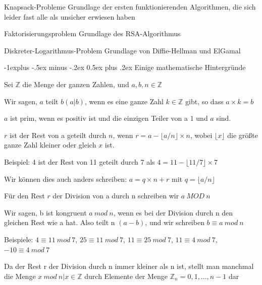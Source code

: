 \documentclass[a4paper]{article}
\makeatletter
\renewcommand{\subsection}{\@startsection{subsection}{2}{0mm}%
 {-1explus -.5ex minus -.2ex}%
 {0.5ex plus .2ex}%
 {\normalfont\normalsize\bfseries}}
\makeatother
\begin{document}
\begin{multicols}{3}
\begin{itemize*}
\begin{itemize*}
            \end{itemize*}
            \begin{description*}
                  \item[Knapsack-Probleme] Grundlage der ersten funktionierenden Algorithmen, die sich leider fast alle als unsicher erwiesen haben
                  \item[Faktorisierungsproblem] Grundlage des RSA-Algorithmus
                  \item[Diskreter-Logarithmus-Problem] Grundlage von Diffie-Hellman und ElGamal
            \end{description*}
      \end{itemize*}

      \subsection{Einige mathematische Hintergründe}
      \begin{itemize*}
            \item Sei $\mathbb{Z}$ die Menge der ganzen Zahlen, und $a,b,n\in\mathbb{Z}$
            \item Wir sagen, $a$ teilt $b(a| b)$, wenn es eine ganze Zahl $k\in\mathbb{Z}$ gibt, so dass $a\times k=b$
            \item $a$ ist prim, wenn es positiv ist und die einzigen Teiler von a $1$ und $a$ sind.
            \item $r$ ist der Rest von a geteilt durch $n$, wenn $r=a-\lfloor a / n \rfloor\times n$, wobei
            $\lfloor x\rfloor$ die größte ganze Zahl kleiner oder gleich $x$ ist.
            \begin{itemize*}
                  \item Beispiel: 4 ist der Rest von 11 geteilt durch 7 als $4=11-\lfloor 11/7\rfloor\times 7$
                  \item Wir können dies auch anders schreiben: $a=q\times n + r$ mit $q=\lfloor a/n\rfloor$
            \end{itemize*}
            \item Für den Rest $r$ der Division von a durch n schreiben wir $a\ MOD\ n$
            \item Wir sagen, b ist kongruent $a\ mod\ n$, wenn es bei der Division durch n den gleichen Rest wie a hat. Also teilt n $(a-b)$, und wir schreiben $b\equiv a\ mod\ n$
            \item Beispiele: $4\equiv 11\ mod\ 7$, $25\equiv 11\ mod\ 7$, $11\equiv 25\ mod\ 7$, $11\equiv 4\ mod\ 7$, $-10\equiv 4\ mod\ 7$
            \item Da der Rest r der Division durch n immer kleiner als n ist, stellt man manchmal die Menge ${x\ mod\ n | x\in\mathbb{Z}}$ durch Elemente der Menge $\mathbb{Z}_n={0, 1, ..., n-1}$ dar
      \end{itemize*}


\end{multicols}
\end{document}
